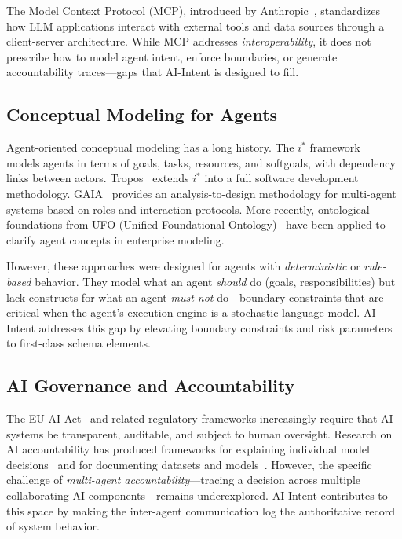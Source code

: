 \documentclass[runningheads]{llncs}
\begin{document}
The Model Context Protocol (MCP), introduced by Anthropic~\cite{anthropic2024mcp}, standardizes how LLM applications interact with external tools and data sources through a client-server architecture. While MCP addresses \emph{interoperability}, it does not prescribe how to model agent intent, enforce boundaries, or generate accountability traces---gaps that AI-Intent is designed to fill.

\subsection{Conceptual Modeling for Agents}

Agent-oriented conceptual modeling has a long history. The $i^*$ framework~\cite{yu2011social} models agents in terms of goals, tasks, resources, and softgoals, with dependency links between actors. Tropos~\cite{bresciani2004tropos} extends $i^*$ into a full software development methodology. GAIA~\cite{wooldridge2000gaia} provides an analysis-to-design methodology for multi-agent systems based on roles and interaction protocols. More recently, ontological foundations from UFO (Unified Foundational Ontology)~\cite{guizzardi2005ontological} have been applied to clarify agent concepts in enterprise modeling.

However, these approaches were designed for agents with \emph{deterministic} or \emph{rule-based} behavior. They model what an agent \emph{should} do (goals, responsibilities) but lack constructs for what an agent \emph{must not} do---boundary constraints that are critical when the agent's execution engine is a stochastic language model. AI-Intent addresses this gap by elevating boundary constraints and risk parameters to first-class schema elements.

\subsection{AI Governance and Accountability}

The EU AI Act~\cite{euaiact2024} and related regulatory frameworks increasingly require that AI systems be transparent, auditable, and subject to human oversight. Research on AI accountability has produced frameworks for explaining individual model decisions~\cite{arrieta2020explainable} and for documenting datasets and models~\cite{gebru2021datasheets,mitchell2019model}. However, the specific challenge of \emph{multi-agent accountability}---tracing a decision across multiple collaborating AI components---remains underexplored. AI-Intent contributes to this space by making the inter-agent communication log the authoritative record of system behavior.
\end{document}
